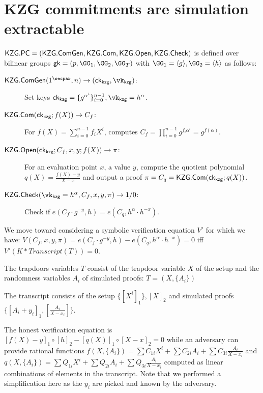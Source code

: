 \documentclass[runningheads,11pt]{llncs}
\begin{document}
\def\open{{\sf Open}}
\def\check{{\sf Check}}
\def\gk{{\sf gk}}

\def\ck{{\sf ck}}
\newcommand{\secp}{\lambda}

\section{KZG commitments are simulation extractable}
$\Kzg.\PC = (\Kzg.\cgen,\Kzg.\CM,\allowbreak  \Kzg.\open,\allowbreak \Kzg.\check)$ is defined over bilinear groups $\gk=(p,\GG_1,\allowbreak \GG_2, \allowbreak \GG_T )$ with $\GG_1 =\langle g\rangle, \GG_2 =\langle h \rangle$ as follows:
\begin{description}%
\item[$\Kzg.\cgen(1^\secpar, n) \to (\ck_\kzg, \vk_\kzg)$:] Set keys
$\ck_\kzg = \{g^{\alpha^i}\}_{i=0}^{n-1}, \allowbreak\vk_\kzg = h^\alpha$.
\item[$\Kzg.\CM(\ck_\kzg; f(X)) \to C_f$:]  For $f(X) = \sum_{i=0}^{n-1} f_i X^i$, computes  $C_f=\prod _{i=0}^{n-1} g^{f_i \alpha^i} = g^{f(\alpha)} $.
\item[$\Kzg.\open(\ck_\kzg; C_f, x, y; f(X)) \to \pi$:] For an evaluation point $x$, a value $y$, compute the quotient  polynomial $q(X) = \displaystyle\frac{f(X) -y }{X-x}$ and output a proof $\pi = C_q = \Kzg.\CM(\ck_\kzg; q(X)) $.
\item[$\Kzg.\check(\vk_\kzg = h^\alpha, C_f, x, y, \pi) \to 1/0$:] Check if $e(C_f \cdot  g^{-y}, h)=e(C_q , h^{\alpha}\cdot h^{-x})$.
\end{description}

We move toward considering a symbolic verification equation $V'$ for which we have:
$V(C_{f},x,y,\pi) =  e(C_f \cdot  g^{-y}, h) - e(C_q , h^{\alpha}\cdot h^{-x}) = 0$ iff $V'(K * Transcript (T)) = 0$.

The trapdoors variables $T$ consist of the trapdoor variable $X$ of the setup and the randomness variables $A_{i}$ of simulated proofs:
$T=(X, \{A_{i}\})$

The transcript consists of the setup $\{[X^{i}]_{1}\}, [X]_{2}$ and simulated proofs $\{[A_{i} + y_{i}]_{1}, [\frac{A_{i}}{X-x_{i}}]\}$.

The honest verification equation is
$[f(X) - y]_1 \circ [h]_{2} - [q(X)]_1 \circ [X-x]_{2}=0$
while an adversary can provide rational functions
$f(X, \{A_{i}\}) = \sum C_{1i} X^{i} + \sum C_{2i} A_{i} + \sum C_{3i} \frac{A_{i}}{X-x_{i}}$ and
$q(X, \{A_{i}\}) = \sum Q_{1i} X^{i} + \sum Q_{2i} A_{i} + \sum Q_{3i} \frac{A_{i}}{X-x_{i}}$ computed as linear combinations of elements in the transcript. Note that we performed a simplification here as the $y_{i}$ are picked and known by the adversary.
\end{document}
